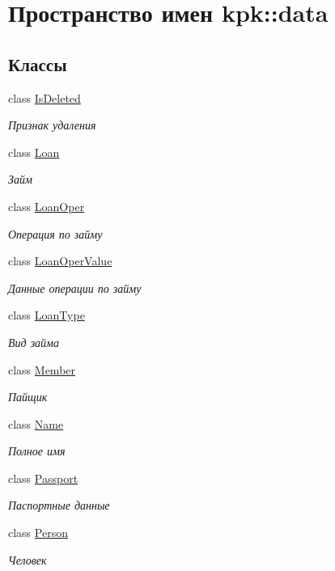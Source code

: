\hypertarget{namespacekpk_1_1data}{}\section{Пространство имен kpk\+:\+:data}
\label{namespacekpk_1_1data}
\subsection*{Классы}
\begin{DoxyCompactItemize}
\item 
class \hyperlink{classkpk_1_1data_1_1_is_deleted}{Is\+Deleted}
\begin{DoxyCompactList}\small\item\em Признак удаления \end{DoxyCompactList}\item 
class \hyperlink{classkpk_1_1data_1_1_loan}{Loan}
\begin{DoxyCompactList}\small\item\em Займ \end{DoxyCompactList}\item 
class \hyperlink{classkpk_1_1data_1_1_loan_oper}{Loan\+Oper}
\begin{DoxyCompactList}\small\item\em Операция по займу \end{DoxyCompactList}\item 
class \hyperlink{classkpk_1_1data_1_1_loan_oper_value}{Loan\+Oper\+Value}
\begin{DoxyCompactList}\small\item\em Данные операции по займу \end{DoxyCompactList}\item 
class \hyperlink{classkpk_1_1data_1_1_loan_type}{Loan\+Type}
\begin{DoxyCompactList}\small\item\em Вид займа \end{DoxyCompactList}\item 
class \hyperlink{classkpk_1_1data_1_1_member}{Member}
\begin{DoxyCompactList}\small\item\em Пайщик \end{DoxyCompactList}\item 
class \hyperlink{classkpk_1_1data_1_1_name}{Name}
\begin{DoxyCompactList}\small\item\em Полное имя \end{DoxyCompactList}\item 
class \hyperlink{classkpk_1_1data_1_1_passport}{Passport}
\begin{DoxyCompactList}\small\item\em Паспортные данные \end{DoxyCompactList}\item 
class \hyperlink{classkpk_1_1data_1_1_person}{Person}
\begin{DoxyCompactList}\small\item\em Человек \end{DoxyCompactList}\end{DoxyCompactItemize}
